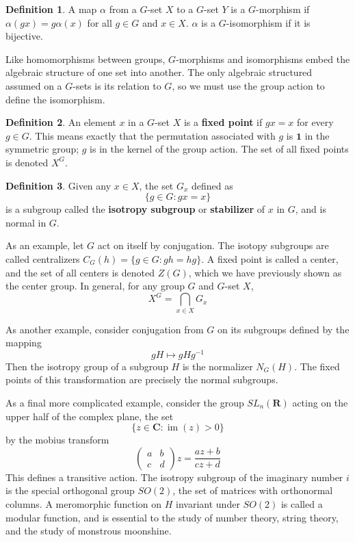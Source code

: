\documentclass[12pt]{amsbook}
\theoremstyle{plain}
\theoremstyle{definition}
\newtheorem{definition}{Definition}
\DeclareMathOperator{\im}{im}
\begin{document}
\begin{definition}
    A map $\alpha$ from a  $G$-set $X$ to a $G$-set $Y$ is a $G$-morphism  if $\alpha(gx) = g\alpha(x)$ for all $g \in G$ and $x \in X$. $\alpha$ is a $G$-isomorphism if it is bijective.
\end{definition}

Like homomorphisms between groups, $G$-morphisms and isomorphisms embed the algebraic structure of one set into another. The only algebraic structured assumed on a $G$-sets is its relation to $G$, so we must use the group action to define the isomorphism.

\begin{definition}
    An element $x$ in a $G$-set $X$ is a {\bf fixed point}  if $gx = x$ for every $g \in G$. This means exactly that the permutation associated with $g$ is $\mathbf{1}$ in the symmetric group; $g$ is in the kernel of the group action. The set of all fixed points is denoted $X^G$.
\end{definition}

\begin{definition}
    Given any $x \in X$, the set $G_x$ defined as
    \[ \{ g \in G : gx = x \} \]
    is a subgroup called the {\bf isotropy subgroup}  or {\bf stabilizer}  of $x$ in $G$, and is normal in $G$.
\end{definition}

As an example, let $G$ act on itself by conjugation. The isotopy subgroups are called centralizers $C_G(h) = \{ g \in G : gh = hg \}$. A fixed point is called a center, and the set of all centers is denoted $Z(G)$, which we have previously shown as the center group. In general, for any group $G$ and $G$-set $X$,
%
\[ X^G = \bigcap_{x \in X} G_x \]

As another example, consider conjugation from $G$ on its subgroups defined by the mapping
%
\[ gH \mapsto gHg^{-1} \]
%
Then the isotropy group of a subgroup $H$ is the normalizer $N_G(H)$. The fixed points of this transformation are precisely the normal subgroups.

As a final more complicated example, consider the group $SL_n(\mathbf{R})$ acting on the upper half of the complex plane, the set
%
\[ \{ z \in \mathbf{C} : \im(z) > 0 \} \]
%
by the mobius transform
%
\[\begin{pmatrix} a & b \\ c & d \end{pmatrix} z = \frac{az + b}{cz + d}\]
%
This defines a transitive action. The isotropy subgroup of the imaginary number $i$ is the special orthogonal group $SO(2)$, the set of matrices with orthonormal columns. A meromorphic function on $H$ invariant under $SO(2)$ is called a modular function, and is essential to the study of number theory, string theory, and the study of monstrous moonshine.
\end{document}
